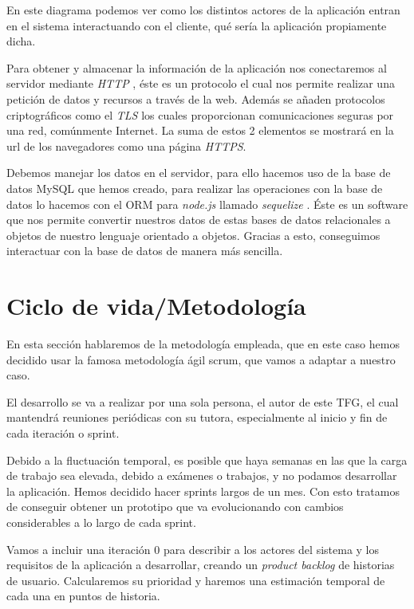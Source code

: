 En este diagrama podemos ver como los distintos actores de la aplicación entran en el sistema interactuando con el cliente, qué sería la aplicación propiamente dicha. 

Para obtener y almacenar la información de la aplicación nos conectaremos al servidor mediante \textit{HTTP} \cite{http}, éste es un protocolo el cual nos permite realizar una petición de datos y recursos a través de la web. Además se añaden protocolos criptográficos como el \textit{TLS} \cite{tls} los cuales proporcionan comunicaciones seguras por una red, comúnmente Internet. La suma de estos 2 elementos se mostrará en la url de los navegadores como una página \textit{HTTPS}.

Debemos manejar los datos en el servidor, para ello hacemos uso de la base de datos MySQL que hemos creado, para realizar las operaciones con la base de datos lo hacemos con el ORM para \textit{node.js} llamado \textit{sequelize} \cite{orm}. Éste es un software que nos permite convertir nuestros datos de estas bases de datos relacionales a objetos de nuestro lenguaje orientado a objetos. Gracias a esto, conseguimos interactuar con la base de datos de manera más sencilla.

\section{Ciclo de vida/Metodología}  \label{metod}
En esta sección hablaremos de la metodología empleada, que en este caso hemos decidido usar la famosa metodología ágil scrum, que vamos a adaptar a nuestro caso.

El desarrollo se va a realizar por una sola persona, el autor de este TFG, el cual mantendrá reuniones periódicas con su tutora, especialmente al inicio y fin de cada iteración o sprint.

Debido a la fluctuación temporal, es posible que haya semanas en las que la carga de trabajo sea elevada, debido a exámenes o trabajos, y no podamos desarrollar la aplicación. Hemos decidido hacer sprints largos de un mes. Con esto tratamos de conseguir obtener un prototipo que va evolucionando con cambios considerables a lo largo de cada sprint.

Vamos a incluir una iteración 0 para describir a los actores del sistema y los requisitos de la aplicación a desarrollar, creando un \textit{product backlog} de historias de usuario. Calcularemos  su prioridad y haremos una estimación temporal de cada una en puntos de historia.  

